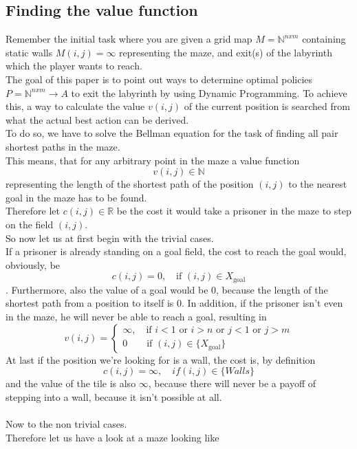 \documentclass[conference]{IEEEtran}
\begin{document}
\subsection{Finding the value function}
Remember the initial task where you are given a grid map $M=\mathbb{N}^{nxm}$ containing static walls $M(i,j)=\infty$ representing the maze, and exit(s) of the labyrinth which the player wants to reach.\\
The goal of this paper is to point out ways to determine optimal policies $P=\mathbb{N}^{nxm}\rightarrow A$ to exit the labyrinth by using Dynamic Programming. To achieve this, a way to calculate the value $v(i,j)$ of the current position is searched from what the actual best action can be derived.\\
To do so, we have to solve the Bellman equation for the task of finding all pair shortest paths in the maze.\\
This means, that for any arbitrary point in the maze a value function
\begin{equation}
v(i,j)\in \mathbb{N}
\end{equation}
representing the length of the shortest path of the position $(i, j)$ to the nearest goal in the maze has to be found.\\
Therefore let $c(i,j) \in \mathbb{R}$ be the cost it would take a prisoner in the maze to step on the field $(i,j)$.\\

So now let us at first begin with the trivial cases.\\
If a prisoner is already standing on a goal field, the cost to reach the goal would, obviously, be 
\begin{equation}
c(i,j) = 0, \quad \text{if } (i,j) \in X_\text{goal}
\end{equation}. 
Furthermore, also the value of a goal would be $0$, because the length of the shortest path from a position to itself is $0$.
In addition, if the prisoner isn't even in the maze, he will never be able to reach a goal, resulting in
\begin{equation}
v(i,j) = 
  \begin{cases}	
	\infty, \quad \text{if } i < 1 \text{ or } i > n \text{ or } j < 1 \text{ or } j > m \\
	0 \quad \quad \text{if } (i,j) \in \{X_\text{goal}\}
  \end{cases}
\end{equation}
At last if the position we're looking for is a wall, the cost is, by definition
\begin{equation}
c(i,j) = \infty, \quad if (i,j) \in \{Walls\}
\end{equation}
and the value of the tile is also $\infty$, because there will never be a payoff of stepping into a wall, because it isn't possible at all.
\\\\
Now to the non trivial cases.\\
Therefore let us have a look at a maze looking like
\end{document}
